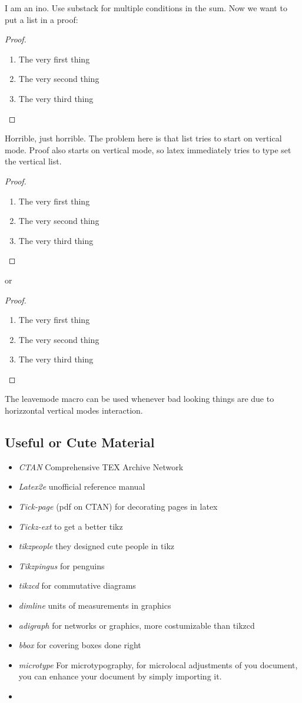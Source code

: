 \documentclass[11pt,a4paper,oneside,openany]{book}
\begin{document}
I am an ino. Use substack for multiple conditions in the sum.
Now we want to put a list in a proof:
\begin{proof}
\begin{enumerate}
        \item The very first thing
        \item The very second thing
        \item The very third thing
    \end{enumerate}
\end{proof}
Horrible, just horrible. The problem here is that list tries to start on vertical mode. Proof also starts on vertical mode, so latex immediately tries to type set the vertical list. 
\begin{proof}\
    \begin{enumerate}
        \item The very first thing
        \item The very second thing
        \item The very third thing
    \end{enumerate}
\end{proof}
or
\begin{proof}\leavevmode
    \begin{enumerate}
        \item The very first thing
        \item The very second thing
        \item The very third thing
    \end{enumerate}
\end{proof}
The leavemode macro can be used whenever bad looking things are due to horizzontal vertical modes interaction.

\subsection{Useful or Cute Material}
\begin{itemize}
    \item \emph{CTAN} Comprehensive TEX Archive Network
    \item \emph{Latex2e} unofficial reference manual
    \item \emph{Tick-page} (pdf on CTAN) for decorating pages in latex
    \item \emph{Tickz-ext} to get a better tikz
    \item \emph{tikzpeople} they designed cute people in tikz
    \item \emph{Tikzpingus} for penguins
    \item \emph{tikzcd} for commutative diagrams
    \item \emph{dimline} units of measurements in graphics
    \item \emph{adigraph} for networks or graphics, more costumizable than tikzcd
    \item \emph{bbox} for covering boxes done right
    \item \emph{microtype} For microtypography, for microlocal adjustments of you document, you can enhance your document by simply importing it.
    \item 
\end{itemize}
\end{document}
